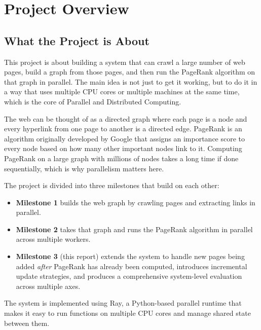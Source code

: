 \documentclass[11pt,a4paper]{article}
\begin{document}
\section{Project Overview}

\subsection{What the Project is About}
This project is about building a system that can crawl a large number of
web pages, build a graph from those pages, and then run the PageRank
algorithm on that graph in parallel. The main idea is not just to get it
working, but to do it in a way that uses multiple CPU cores or multiple
machines at the same time, which is the core of Parallel and Distributed
Computing.

The web can be thought of as a directed graph where each page is a node
and every hyperlink from one page to another is a directed edge. PageRank
is an algorithm originally developed by Google that assigns an importance
score to every node based on how many other important nodes link to it.
Computing PageRank on a large graph with millions of nodes takes a long
time if done sequentially, which is why parallelism matters here.

The project is divided into three milestones that build on each other:
\begin{itemize}
    \item \textbf{Milestone 1} builds the web graph by crawling pages and
    extracting links in parallel.
    \item \textbf{Milestone 2} takes that graph and runs the PageRank
    algorithm in parallel across multiple workers.
    \item \textbf{Milestone 3} (this report) extends the system to handle
    new pages being added \emph{after} PageRank has already been computed,
    introduces incremental update strategies, and produces a comprehensive
    system-level evaluation across multiple axes.
\end{itemize}

The system is implemented using Ray, a Python-based parallel runtime that
makes it easy to run functions on multiple CPU cores and manage shared
state between them.
\end{document}
